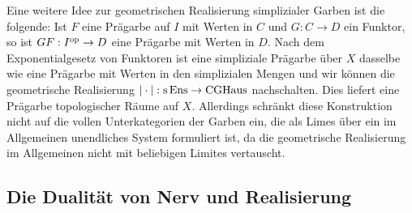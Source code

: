 \begin{bem}
  Eine weitere Idee zur geometrischen Realisierung simplizialer Garben
  ist die folgende: Ist $F$ eine Prägarbe auf $I$ mit Werten in $C$
  und $G: C \to D$ ein Funktor, so ist $GF: I^\mathrm{op} \to D$ eine Prägarbe
  mit Werten in $D$. Nach dem Exponentialgesetz von Funktoren ist eine
  simpliziale Prägarbe über $X$ dasselbe wie eine Prägarbe mit Werten
  in den simplizialen Mengen und wir können die geometrische
  Realisierung $|\cdot|: \operatorname{s}\operatorname{Ens} \to \operatorname{CGHaus}$ nachschalten. Dies
  liefert eine Prägarbe topologischer Räume auf $X$. Allerdings
  schränkt diese Konstruktion nicht auf die vollen Unterkategorien der
  Garben ein, die als Limes über ein im Allgemeinen unendliches System
  formuliert ist, da die geometrische Realisierung im Allgemeinen
  nicht mit beliebigen Limites vertauscht.
\end{bem}

\subsection{Die Dualität von Nerv und Realisierung}

